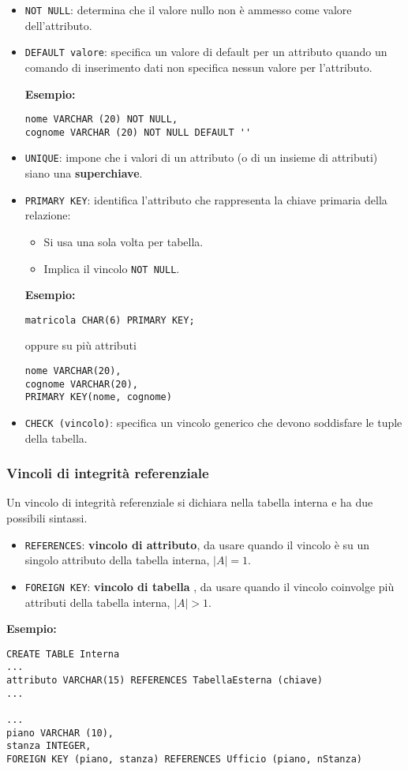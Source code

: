 \documentclass[a4paper, 10pt]{article}
\begin{document}
	\begin{itemize}
		\item \lstinline|NOT NULL|: determina che il valore nullo non è ammesso come
		valore dell’attributo.
		\item \lstinline|DEFAULT valore|: specifica un valore di
		default per un attributo quando un comando di inserimento dati non
		specifica nessun valore per l’attributo.
		
	\textbf{Esempio:}
	\begin{lstlisting}
nome VARCHAR (20) NOT NULL,
cognome VARCHAR (20) NOT NULL DEFAULT ''
	\end{lstlisting}
		\item \lstinline|UNIQUE|: impone che i valori di un attributo (o di un insieme di
		attributi) siano una \textbf{superchiave}.
		\item \lstinline|PRIMARY KEY|: identifica l’attributo che rappresenta la chiave
		primaria della relazione:
		\begin{itemize}
			\item Si usa una sola volta per tabella.
			\item Implica il vincolo \lstinline|NOT NULL|.
		\end{itemize}
	
	\textbf{Esempio: }
	\begin{lstlisting}
matricola CHAR(6) PRIMARY KEY;
	\end{lstlisting}
	oppure su più attributi
	\begin{lstlisting}
nome VARCHAR(20),
cognome VARCHAR(20),
PRIMARY KEY(nome, cognome)
	\end{lstlisting}
	
	\item \lstinline|CHECK (vincolo)|: specifica un vincolo generico che devono soddisfare le
	tuple della tabella.
	\end{itemize}
	
	\subsubsection{Vincoli di integrità referenziale}
		Un vincolo di integrità referenziale si dichiara nella tabella interna e ha
		due possibili sintassi.
		\begin{itemize}
			\item \lstinline|REFERENCES|: \textbf{vincolo di attributo}, da usare quando il vincolo è su un
			singolo attributo della tabella interna, $ |A| = 1 $.
			\item \lstinline|FOREIGN KEY|: \textbf{vincolo di tabella} , da usare quando il vincolo coinvolge più attributi della tabella interna, $ |A| > 1 $.
		\end{itemize}
		\textbf{Esempio:}
		\begin{lstlisting}
CREATE TABLE Interna
...
attributo VARCHAR(15) REFERENCES TabellaEsterna (chiave)
...

...
piano VARCHAR (10),
stanza INTEGER,
FOREIGN KEY (piano, stanza) REFERENCES Ufficio (piano, nStanza)
		\end{lstlisting}
		
\end{document}
